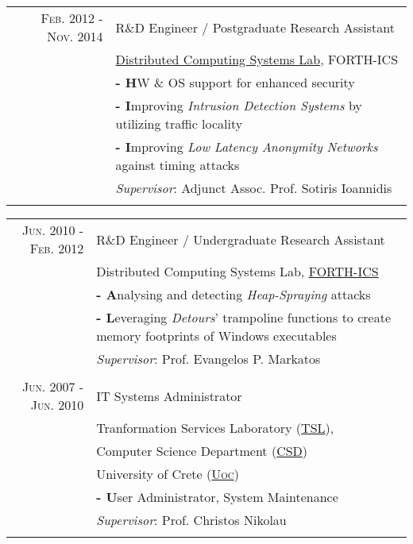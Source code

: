 \documentclass[a4paper,10pt]{article} %
\begin{document}
\begin{tabular}{r|p{}}
\textsc{Feb. 2012 - Nov. 2014} & {\large R\&D Engineer / Postgraduate Research Assistant} \\
& {\large \href{https://www.ics.forth.gr/dcs/}{Distributed Computing Systems Lab}, FORTH-ICS} \\
& \textbf{- H}W \& OS support for enhanced security \\
& \textbf{- I}mproving \emph{Intrusion Detection Systems} by utilizing traffic locality \\
& \textbf{- I}mproving \emph{Low Latency Anonymity Networks} against timing  attacks \\
& \emph{Supervisor}: Adjunct Assoc. Prof. Sotiris Ioannidis \\
\multicolumn{2}{c}{} \\
\end{tabular}

\begin{tabular}{r|p{}}
\textsc{Jun. 2010 - Feb. 2012} & {\large R\&D Engineer / Undergraduate Research Assistant} \\
& {\large Distributed Computing Systems Lab, \href{https://www.ics.forth.gr/}{\textsc{FORTH-ICS}}} \\
& \textbf{- A}nalysing and detecting \emph{Heap-Spraying} attacks \\
& \textbf{- L}everaging \emph{Detours}' trampoline functions to create memory footprints of Windows executables \\
& \emph{Supervisor}: Prof. Evangelos P. Markatos \\
\multicolumn{2}{c}{} \\

\textsc{Jun. 2007 - Jun. 2010} & {\large IT Systems Administrator} \\
& {\large Tranformation Services Laboratory (\href{http://www.tsl.gr/}{\textsc{TSL}}),} \\
& {\large Computer Science Department (\href{https://www.csd.uoc.gr/CSD/index.jsp?lang=en}{CSD})} \\
& {\large  University of Crete (\textsc{\href{http://www.en.uoc.gr/}{Uoc})}} \\
& \textbf{- U}ser Administrator, System Maintenance \\
& \emph{Supervisor}: Prof. Christos Nikolau \\
\multicolumn{2}{c}{} \\

\end{tabular}

\end{document}
